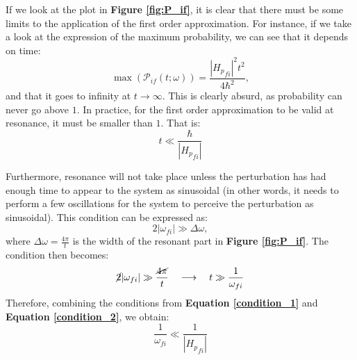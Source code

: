 If we look at the plot in \textbf{Figure \ref{fig:P_if}}, it is clear that there must be some limits to the application of the first order approximation. For instance, if we take a look at the expression of the maximum probability, we can see that it depends on time:
\begin{equation}
    \max \left(\mathcal{P}_{if}(t;\omega)\right) = \frac{\left|{H_p}_{fi}\right|^2t^2}{4\hbar^2},
\end{equation}
and that it goes to infinity at $t\to \infty$. This is clearly absurd, as probability can never go above $1$. In practice, for the first order approximation to be valid at resonance, it must be smaller than $1$. That is:
\begin{equation}\label{condition_1}
    t\ll\frac{\hbar }{\left|{H_p}_{fi}\right|}
\end{equation}

Furthermore, resonance will not take place unless the perturbation has had enough time to appear to the system as sinusoidal (in other words, it needs to perform a few oscillations for the system to perceive the perturbation as sinusoidal). This condition can  be expressed as:
\begin{equation}
    2|\omega_{fi}|\gg \Delta \omega,
\end{equation}
where $\Delta \omega = \frac{4\pi}{t}$ is the width of the resonant part in \textbf{Figure \ref{fig:P_if}}. The condition then becomes:
\begin{equation}\label{condition_2}
    \cancel{2}|\omega_{fi}|\gg \frac{\cancel{4\pi}}{t}\quad\longrightarrow\quad t \gg \frac{1}{\omega_{fi}}
\end{equation}
Therefore, combining the conditions from \textbf{Equation \ref{condition_1}} and \textbf{Equation \ref{condition_2}}, we obtain:
\begin{equation}
    \frac{1}{\omega_{fi}} \ll \frac{1}{\left|{H_p}_{fi}\right|}
\end{equation}